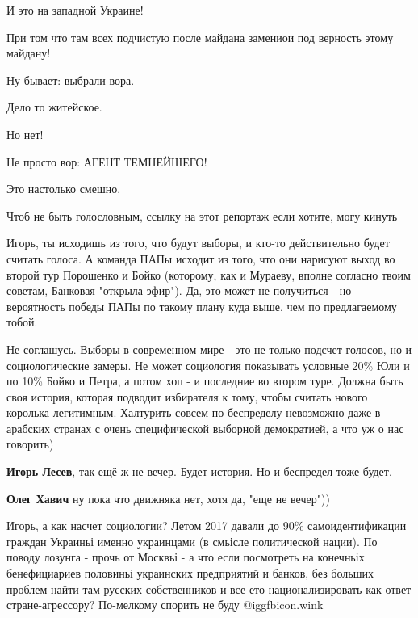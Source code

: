 \begin{itemize}
\begin{itemize}
И это на западной Украине!

При том что там всех подчистую после майдана замениои под верность этому
майдану!

Ну бывает: выбрали вора.

Дело то житейское.

Но нет!

Не просто вор: АГЕНТ ТЕМНЕЙШЕГО!

Это настолько смешно.

Чтоб не быть голословным, ссылку на этот репортаж если хотите, могу кинуть

\end{itemize} %


Игорь, ты исходишь из того, что будут выборы, и кто-то действительно будет
считать голоса. А команда ПАПы исходит из того, что они нарисуют выход во
второй тур Порошенко и Бойко (которому, как и Мураеву, вполне согласно твоим
советам, Банковая "открыла эфир"). Да, это может не получиться - но вероятность
победы ПАПы по такому плану куда выше, чем по предлагаемому тобой.

\begin{itemize} %

Не соглашусь. Выборы в современном мире - это не только подсчет голосов, но и
социологические замеры. Не может социология показывать условные 20\% Юли и по
10\% Бойко и Петра, а потом хоп - и последние во втором туре. Должна быть своя
история, которая подводит избирателя к тому, чтобы считать нового королька
легитимным. Халтурить совсем по беспределу невозможно даже в арабских странах с
очень специфической выборной демократией, а что уж о нас говорить)

\textbf{Игорь Лесев}, так ещё ж не вечер. Будет история. Но и беспредел тоже будет.

\textbf{Олег Хавич} ну пока что движняка нет, хотя да, "еще не вечер"))
\end{itemize} %


Игорь, а как насчет социологии? Летом 2017 давали до 90\% самоидентификации
граждан Украиньі именно украинцами (в смьісле политической нации). По поводу
лозунга - прочь от Москвьі - а что если посмотреть на конечньіх бенефициариев
половиньі украинских предприятий и банков, без больших проблем найти там
русских собственников и все ето национализировать как ответ стране-агрессору?
По-мелкому спорить не буду @igg{fbicon.wink} 


\end{itemize}

